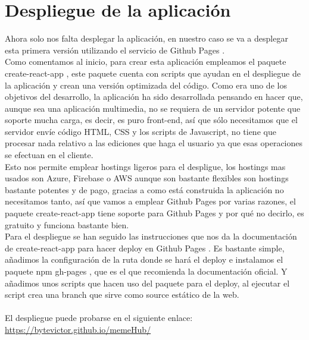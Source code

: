 \newpage
\section{Despliegue de la aplicación}

Ahora solo nos falta desplegar la aplicación, en nuestro caso se va a desplegar esta primera 
versión utilizando el servicio de Github Pages \cite{GithubPages}.
\\
Como comentamos al inicio, para crear esta aplicación empleamos el paquete create-react-app \cite{create-react-app},
este paquete cuenta con scripts que ayudan en el despliegue de la aplicación y crean una 
versión optimizada del código.
Como era uno de los objetivos del desarrollo, la aplicación ha sido desarrollada pensando
en hacer que, aunque sea una aplicación multimedia, no se requiera de un servidor potente que
soporte mucha carga, es decir, es puro front-end, así que sólo necesitamos que el servidor
envíe código HTML, CSS y los scripts de Javascript, no tiene que procesar nada relativo a las
ediciones que haga el usuario ya que esas operaciones se efectuan en el cliente.
\\
Esto nos permite emplear hostings ligeros para el despligue, 
los hostings mas usados son Azure, Firebase o AWS aunque son bastante flexibles son hostings 
bastante potentes y de pago, gracias a como está construida la aplicación no necesitamos tanto,
así que vamos a emplear Github Pages por varias razones, el paquete 
create-react-app \cite{create-react-app} tiene soporte para Github Pages \cite{GithubPages}
y por qué no decirlo, es gratuito y funciona bastante bien.
\\
Para el despliegue se han seguido las instrucciones que nos da la documentación de 
create-react-app para hacer deploy en Github Pages \cite{GithubPagesDeploy}.
Es bastante simple, añadimos la configuración de la ruta donde se hará el deploy e instalamos
el paquete npm gh-pages \cite{gh-pages}, que es el que recomienda la documentación oficial.
Y añadimos unos scripts que hacen uso del paquete para el deploy, al ejecutar el script
crea una branch que sirve como source estático de la web.
\\\\
El despliegue puede probarse en el siguiente enlace: \url{https://bytevictor.github.io/memeHub/}